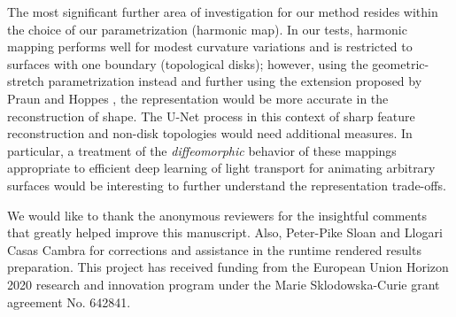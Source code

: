 The most significant further area of investigation for our method resides within the choice of our parametrization (harmonic map). In our tests, harmonic mapping performs well for modest curvature variations and is restricted to surfaces with one boundary (topological disks); however, using the geometric-stretch parametrization instead and further using the extension proposed by Praun and Hoppes , the representation would be more accurate in the reconstruction of shape. The U-Net process in this context of sharp feature reconstruction and non-disk topologies would need additional measures. In particular, a treatment of the \textit{diffeomorphic} behavior \cite{detlefsen2018transformations} of these mappings appropriate to efficient deep learning of light transport for animating arbitrary surfaces would be interesting to further understand the representation trade-offs.


\begin{acks}
We would like to thank the anonymous reviewers for the insightful comments that greatly helped improve this manuscript. Also, Peter-Pike Sloan and Llogari Casas Cambra for corrections and assistance in the runtime rendered results preparation. This project has received funding from the European Union Horizon 2020 research and innovation program under the Marie Sklodowska-Curie grant agreement No. 642841.
\end{acks}